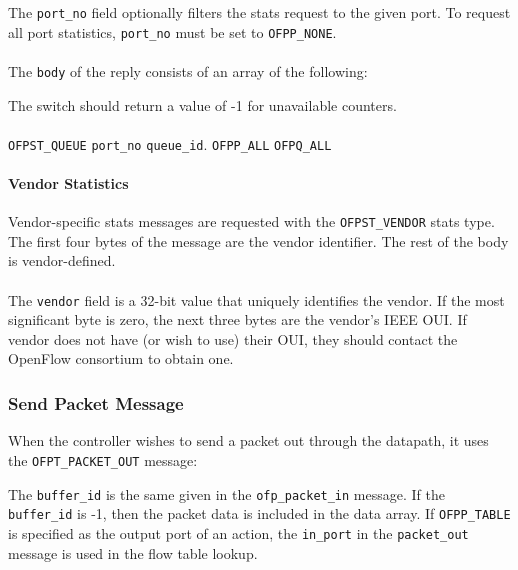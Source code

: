
The \verb|port_no| field optionally filters the stats request to the given port.  To request all port statistics, \verb|port_no| must be set to \verb|OFPP_NONE|.
\\\\
The \verb|body| of the reply consists of an array of the following:


The switch should return a value of -1 for unavailable counters.

\paragraph{}
 \verb|OFPST_QUEUE|  \verb|port_no|  \verb|queue_id|. \verb|OFPP_ALL|
 \verb|OFPQ_ALL| 

\paragraph{Vendor Statistics}
Vendor-specific stats messages are requested with the \verb|OFPST_VENDOR| stats type. The first four bytes of the message are the vendor identifier. The rest of the body is vendor-defined.
\\\\
The \verb|vendor| field is a 32-bit value that uniquely identifies the vendor. If the most significant byte is zero, the next three bytes are the vendor's IEEE OUI. If vendor does not have (or wish to use) their OUI, they should contact the OpenFlow consortium to obtain one. 

\subsubsection{Send Packet Message}
When the controller wishes to send a packet out through the datapath, it uses the \verb|OFPT_PACKET_OUT| message:


The \verb|buffer_id| is the same given in the \verb|ofp_packet_in| message.  If the \verb|buffer_id| is -1, then the packet data is included in the data array. If \verb|OFPP_TABLE| is specified as the output port of an action, the \verb|in_port| in the \verb|packet_out| message is used in the flow table lookup.

